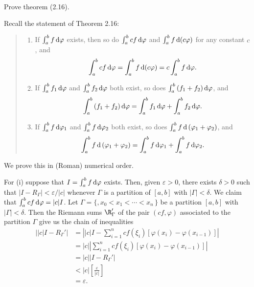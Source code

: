 \begin{problem}
  Prove theorem (2.16).
\end{problem}
\begin{solution}
  Recall the statement of Theorem 2.16:
  \begin{quote}
    \begin{enumerate}[label=(\roman*),noitemsep]
    \item If $\int_a^b f\mathop{}\!\mathrm{d}\varphi$ exists, then so do
      $\int_a^bcf\mathop{}\!\mathrm{d}\varphi$ and $\int_a^b f\mathop{}\!\mathrm{d}(c\varphi)$ for any
      constant $c$, and
      \[
        \int_a^bcf\mathop{}\!\mathrm{d}\varphi=\int_a^bf\mathop{}\!\mathrm{d}(c\varphi)=c\int_a^bf\mathop{}\!\mathrm{d}\varphi.
      \]
    \item If $\int_a^b f_1\mathop{}\!\mathrm{d}\varphi$ and $\int_a^bf_2\mathop{}\!\mathrm{d}\varphi$ both
      exist, so does $\int_a^b\left(f_1+f_2\right)\mathop{}\!\mathrm{d}\varphi$, and
      \[
        \int_a^b\left(f_1+f_2\right)\mathop{}\!\mathrm{d}\varphi=\int_a^bf_1\mathop{}\!\mathrm{d}\varphi+\int_a^bf_2\mathop{}\!\mathrm{d}\varphi.
      \]
    \item If $\int_a^bf\mathop{}\!\mathrm{d}\varphi_1$ and $\int_a^bf\mathop{}\!\mathrm{d}\varphi_2$ both
      exist, so does $\int_a^bf\mathop{}\!\mathrm{d}\left(\varphi_1+\varphi_2\right)$, and
      \[
        \int_a^bf\mathop{}\!\mathrm{d}\left(\varphi_1+\varphi_2\right)=\int_a^bf\mathop{}\!\mathrm{d}\varphi_1+\int_a^bf\mathop{}\!\mathrm{d}\varphi_2.
      \]
    \end{enumerate}
  \end{quote}
  \noindent%
  We prove this in (Roman) numerical order.


  For (i) suppose that $I=\int_a^bf\mathop{}\!\mathrm{d}\varphi$ exists. Then, given
  $\varepsilon>0$, there exists $\delta>0$ such that
  $|I-R_\Gamma|<\varepsilon/|c|$ whenever $\Gamma$ is a partition of
  $[a,b]$ with $|\Gamma|<\delta$. We claim that
  $\int_a^b cf\mathop{}\!\mathrm{d}\varphi=|c|I$. Let $\Gamma=\{,x_0<x_1<\cdots<x_n\,\}$ be
  a partition $[a,b]$ with $|\Gamma|<\delta$. Then the Riemann sums
  $\R_\Gamma'$ of the pair $(cf,\varphi)$ associated to the partition
  $\Gamma$ give us the chain of inequalities
  \begin{align*}
    ||c|I-R_\Gamma'|
    &=\left| |c|I-
      \sum_{i=1}^n cf(\xi_i)[\varphi(x_i)-\varphi(x_{i-1})]
      \right|\\
    &=|c|\left|
      \sum_{i=1}^n cf(\xi_i)[\varphi(x_i)-\varphi(x_{i-1})]
      \right|\\
    &=|c||I-R_\Gamma'|\\
    &<|c|\left[\frac{\varepsilon}{|c|}\right]\\
    &=\varepsilon.
  \end{align*}
\end{solution}

